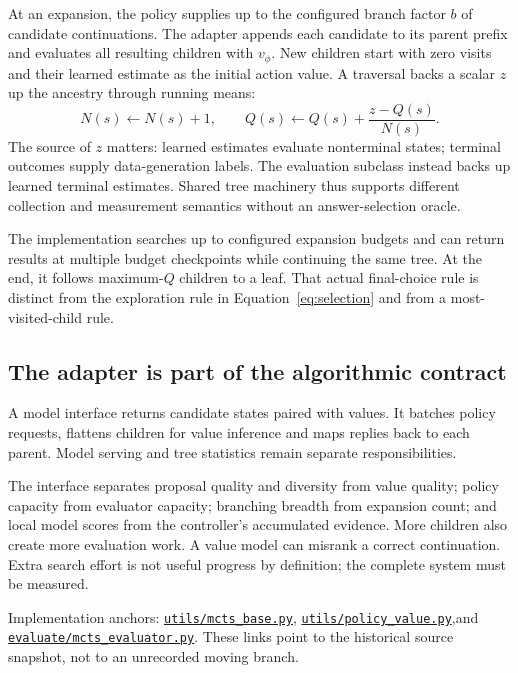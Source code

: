 \documentclass[11pt,letterpaper]{article}
\newcommand{\src}[2]{\href{https://github.com/RaychevAngel/classical_vs_contextual_search/blob/1a7fda10617d34ccd3a87c825cba71e4429de91a/#1}{\texttt{#2}}}
\newcommand{\smallnote}[1]{{\small\color{ink}#1}}
\begin{document}
At an expansion, the policy supplies up to the configured branch factor $b$ of candidate continuations. The adapter appends each candidate to its parent prefix and evaluates all resulting children with $v_\phi$. New children start with zero visits and their learned estimate as the initial action value. A traversal backs a scalar $z$ up the ancestry through running means:
\begin{equation}
N(s)\leftarrow N(s)+1,\qquad
Q(s)\leftarrow Q(s)+\frac{z-Q(s)}{N(s)}.
\label{eq:backup}
\end{equation}
The source of $z$ matters: learned estimates evaluate nonterminal states; terminal outcomes supply data-generation labels. The evaluation subclass instead backs up learned terminal estimates. Shared tree machinery thus supports different collection and measurement semantics without an answer-selection oracle.

The implementation searches up to configured expansion budgets and can return results at multiple budget checkpoints while continuing the same tree. At the end, it follows maximum-$Q$ children to a leaf. That actual final-choice rule is distinct from the exploration rule in Equation~\eqref{eq:selection} and from a most-visited-child rule.

\subsection{The adapter is part of the algorithmic contract}
A model interface returns candidate states paired with values. It batches policy requests, flattens children for value inference and maps replies back to each parent. Model serving and tree statistics remain separate responsibilities.

The interface separates proposal quality and diversity from value quality; policy capacity from evaluator capacity; branching breadth from expansion count; and local model scores from the controller's accumulated evidence.
More children also create more evaluation work. A value model can misrank a correct continuation. Extra search effort is not useful progress by definition; the complete system must be measured.

\smallnote{Implementation anchors: \src{utils/mcts_base.py}{utils/mcts\_base.py}, \src{utils/policy_value.py}{utils/policy\_value.py},\newline and \src{evaluate/mcts_evaluator.py}{evaluate/mcts\_evaluator.py}. These links point to the historical source snapshot, not to an unrecorded moving branch.}
\end{document}
